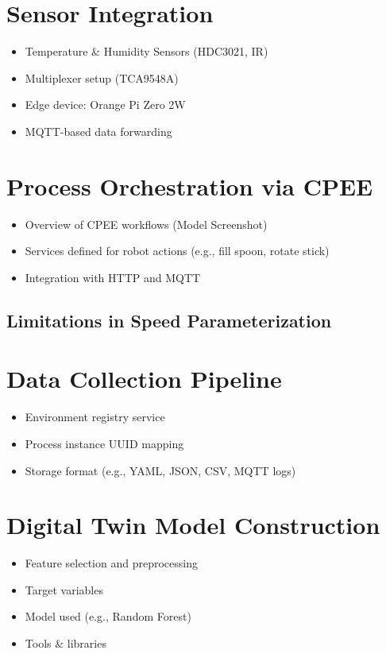 \section{Sensor Integration}
\begin{itemize}
  \item Temperature \& Humidity Sensors (HDC3021, IR)
  \item Multiplexer setup (TCA9548A)
  \item Edge device: Orange Pi Zero 2W
  \item MQTT-based data forwarding
\end{itemize}

\section{Process Orchestration via CPEE}
\begin{itemize}
  \item Overview of CPEE workflows (Model Screenshot)
  \item Services defined for robot actions (e.g., fill spoon, rotate stick)
  \item Integration with HTTP and MQTT
\end{itemize}

\subsection{Limitations in Speed Parameterization}
\section{Data Collection Pipeline}
\begin{itemize}
  \item Environment registry service
  \item Process instance UUID mapping
  \item Storage format (e.g., YAML, JSON, CSV, MQTT logs)
\end{itemize}

\section{Digital Twin Model Construction}
\begin{itemize}
  \item Feature selection and preprocessing
  \item Target variables
  \item Model used (e.g., Random Forest)
  \item Tools \& libraries
\end{itemize}


